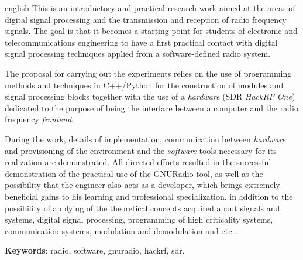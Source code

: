 \documentclass[
  12pt,				%
  openright,			%
  twoside,			%
  a4paper,			%
  english,			%
  french,				%
  spanish,			%
  brazil,				%
  ]{abntex2}
\begin{document}
\begin{resumo}[Abstract]
  \begin{otherlanguage*}{english}
    This is an introductory and practical research work aimed at the areas of digital signal processing and the
    transmission and reception of radio frequency signals. The goal is that it becomes a starting point for
    students of electronic and telecommunications engineering to have a first practical contact with digital
    signal processing techniques applied from a software-defined radio system.

    The proposal for carrying out the experiments relies on the use of programming methods and techniques in
    C++/Python for the construction of modules and signal processing blocks together with the use of a
    \textit{hardware} (SDR \textit{HackRF One}) dedicated to the purpose of being the interface between a
    computer and the radio frequency \textit{frontend}.

    During the work, details of implementation, communication between \textit{hardware} and provisioning of
    the environment and the \textit{software} tools necessary for its realization are demonstrated. All directed
    efforts resulted in the successful demonstration of the practical use of the GNURadio tool, as well as the
    possibility that the engineer also acts as a developer, which brings extremely beneficial gains to his
    learning and professional specialization, in addition to the possibility of applying of the theoretical
    concepts acquired about signals and systems, digital signal processing, programming of high criticality
    systems, communication systems, modulation and demodulation and etc \ldots

    \vspace{\onelineskip}
    \noindent
    \textbf{Keywords}: radio, software, gnuradio, hackrf, sdr.
  \end{otherlanguage*}
\end{resumo}

\listoffigures*
\cleardoublepage

\listoftables*
\cleardoublepage
\end{document}
